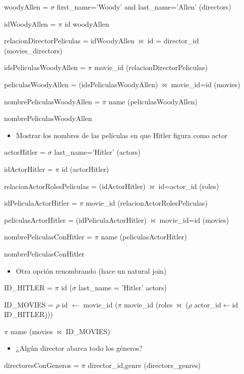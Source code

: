 woodyAllen = $\sigma$ first\_name='Woody' and last\_name='Allen' (directors)

idWoodyAllen = $\pi$ id woodyAllen

relacionDirectorPeliculas = idWoodyAllen $\bowtie$ id = director\_id (movies\_directors)

idsPeliculasWoodyAllen = $\pi$ movie\_id (relacionDirectorPeliculas)

peliculasWoodyAllen = (idsPeliculasWoodyAllen) $\bowtie$ movie\_id=id (movies)

nombrePeliculasWoodyAllen = $\pi$ name (peliculasWoodyAllen)

nombrePeliculasWoodyAllen



\begin{itemize}
\item Mostrar los nombres de las películas en que Hitler figura como actor
\end{itemize}

actorHitler = $\sigma$ last\_name='Hitler' (actors)

idActorHitler = $\pi$ id (actorHitler)

relacionActorRolesPeliculas = (idActorHitler) $\bowtie$ id=actor\_id (roles)

idPeliculaActorHitler = $\pi$ movie\_id (relacionActorRolesPeliculas)

peliculasActorHitler = (idPeliculaActorHitler) $\bowtie$ movie\_id=id (movies)

nombrePeliculasConHitler = $\pi$ name (peliculasActorHitler)

nombrePeliculasConHitler


\begin{itemize}
\item Otra opción renombrando (hace un natural join)
\end{itemize}

ID\_HITLER = $\pi$ id ($\sigma$ last\_name = 'Hitler' actors)

ID\_MOVIES = $\rho$ id $\leftarrow$ movie\_id ($\pi$ movie\_id (roles $\bowtie$ ($\rho$ actor\_id$\leftarrow$id ID\_HITLER)))

$\pi$ name (movies $\bowtie$ ID\_MOVIES)


\begin{itemize}
\item ¿Algún director abarca todo los géneros?
\end{itemize}


directoresConGeneros = $\pi$ director\_id,genre (directors\_genres)

